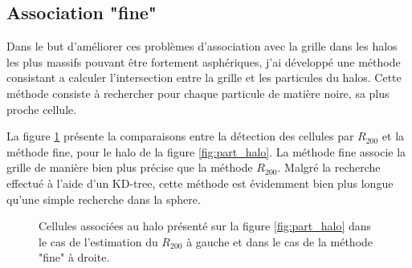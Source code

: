 \subsection{Association "fine"}

Dans le but d'améliorer ces problèmes d'association avec la grille dans les halos les plus massifs pouvant être fortement asphériques, j'ai développé une méthode consistant a calculer l'intersection entre la grille et les particules du halos.
Cette méthode consiste à rechercher pour chaque particule de matière noire, sa plus proche cellule.

La figure \ref{fig:R200_fine} présente la comparaisons entre la détection des cellules par $R_{200}$ et la méthode fine, pour le halo de la figure \ref{fig:part_halo}.
La méthode fine associe la grille de manière bien plus précise que la méthode $R_{200}$.
Malgré la recherche effectué à l'aide d'un KD-tree, cette méthode est évidemment bien plus longue qu'une simple recherche dans la sphere.

\begin{figure}
    \caption[Méthodes d'association matière noire - grille]{Cellules associées au halo présenté sur la figure \ref{fig:part_halo} dans le cas de l'estimation du $R_{200}$ à gauche et dans le cas de la méthode "fine" à droite.       
 	\label{fig:R200_fine}}
\end{figure}

